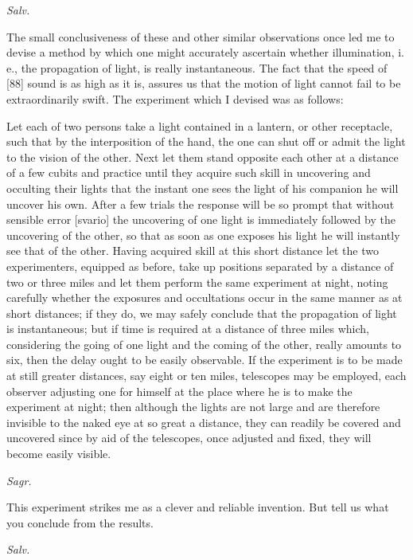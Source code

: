 \documentclass{article}
\begin{document}
{\em Salv.}

The small conclusiveness of these and other similar observations once led me to devise a method by which one might accurately ascertain whether illumination, i. e., the propagation of light, is really instantaneous. The fact that the speed of [88] sound is as high as it is, assures us that the motion of light cannot fail to be extraordinarily swift. The experiment which I devised was as follows:

Let each of two persons take a light contained in a lantern, or other receptacle, such that by the interposition of the hand, the one can shut off or admit the light to the vision of the other. Next let them stand opposite each other at a distance of a few cubits and practice until they acquire such skill in uncovering and occulting their lights that the instant one sees the light of his companion he will uncover his own. After a few trials the response will be so prompt that without sensible error [svario] the uncovering of one light is immediately followed by the uncovering of the other, so that as soon as one exposes his light he will instantly see that of the other. Having acquired skill at this short distance let the two experimenters, equipped as before, take up positions separated by a distance of two or three miles and let them perform the same experiment at night, noting carefully whether the exposures and occultations occur in the same manner as at short distances; if they do, we may safely conclude that the propagation of light is instantaneous; but if time is required at a distance of three miles which, considering the going of one light and the coming of the other, really amounts to six, then the delay ought to be easily observable. If the experiment is to be made at still greater distances, say eight or ten miles, telescopes may be employed, each observer adjusting one for himself at the place where he is to make the experiment at night; then although the lights are not large and are therefore invisible to the naked eye at so great a distance, they can readily be covered and uncovered since by aid of the telescopes, once adjusted and fixed, they will become easily visible.

{\em Sagr.}

This experiment strikes me as a clever and reliable invention. But tell us what you conclude from the results.

{\em Salv.}
\end{document}
